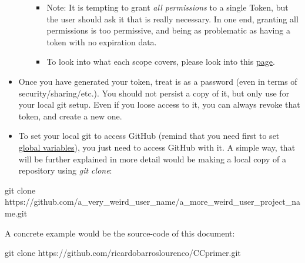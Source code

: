 \documentclass[
]{book}
\newenvironment{Shaded}{\begin{snugshade}}{\end{snugshade}}
\newcommand{\FunctionTok}[1]{\textcolor[rgb]{0.00,0.00,0.00}{#1}}
\newcommand{\NormalTok}[1]{#1}
\providecommand{\tightlist}{%
  \setlength{\itemsep}{0pt}\setlength{\parskip}{0pt}}
\begin{document}
\begin{itemize}
\begin{itemize}
    \begin{itemize}
    \tightlist
    \item
      Note: It is tempting to grant \emph{all permissions} to a single Token, but the user
      should ask it that is really necessary. In one end, granting all permissions
      is too permissive, and being as problematic as having a token with no
      expiration data.
    \item
      To look into what each scope covers, please look into this
      \href{https://docs.github.com/en/developers/apps/building-oauth-apps/scopes-for-oauth-apps\#available-scopes}{page}.
    \end{itemize}
  \end{itemize}
\item
  Once you have generated your token, treat is as a password (even in terms of
  security/sharing/etc.). You should not persist a copy of it, but only use for your
  local git setup. Even if you loose access to it, you can always revoke that
  token, and create a new one.
\item
  To set your local git to access GitHub (remind that you need first to set \href{https://ricardobarroslourenco.github.io/CCprimer/version-control-systems.html\#setting-up-your-local-git-client}{global variables}),
  you just need to access GitHub with it. A simple way, that will be further
  explained in more detail would be making a local copy of a repository using \emph{git clone}:
\end{itemize}

\begin{Shaded}
\begin{Highlighting}[]
\FunctionTok{git}\NormalTok{ clone https://github.com/a\_very\_weird\_user\_name/a\_more\_weird\_user\_project\_name.git}
\end{Highlighting}
\end{Shaded}

A concrete example would be the source-code of this document:

\begin{Shaded}
\begin{Highlighting}[]
\FunctionTok{git}\NormalTok{ clone https://github.com/ricardobarroslourenco/CCprimer.git}
\end{Highlighting}
\end{Shaded}
\end{document}
